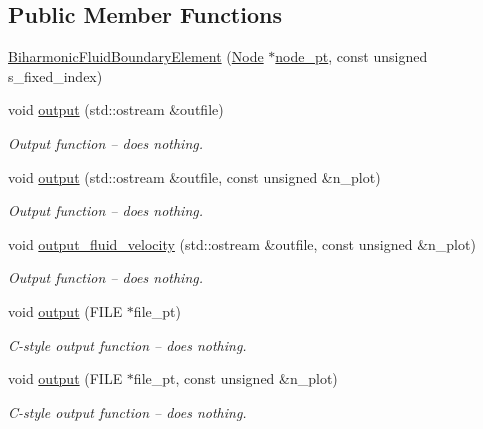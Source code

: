 \subsection*{Public Member Functions}
\begin{DoxyCompactItemize}
\item 
\hyperlink{classoomph_1_1BiharmonicFluidBoundaryElement_a7753395db6939adf4c2ebf5b7d251cef}{Biharmonic\+Fluid\+Boundary\+Element} (\hyperlink{classoomph_1_1Node}{Node} $\ast$\hyperlink{classoomph_1_1FiniteElement_ace0e7fb72a805b5c2c600347bfae7a9b}{node\+\_\+pt}, const unsigned s\+\_\+fixed\+\_\+index)
\item 
void \hyperlink{classoomph_1_1BiharmonicFluidBoundaryElement_a20586e08a9a747f2165b9e2eeb62a4dc}{output} (std\+::ostream \&outfile)
\begin{DoxyCompactList}\small\item\em Output function -- does nothing. \end{DoxyCompactList}\item 
void \hyperlink{classoomph_1_1BiharmonicFluidBoundaryElement_a74ffdc1669962263212c95e7acc3cce2}{output} (std\+::ostream \&outfile, const unsigned \&n\+\_\+plot)
\begin{DoxyCompactList}\small\item\em Output function -- does nothing. \end{DoxyCompactList}\item 
void \hyperlink{classoomph_1_1BiharmonicFluidBoundaryElement_a9a639b1f556286e525b221ed9a96e7f5}{output\+\_\+fluid\+\_\+velocity} (std\+::ostream \&outfile, const unsigned \&n\+\_\+plot)
\begin{DoxyCompactList}\small\item\em Output function -- does nothing. \end{DoxyCompactList}\item 
void \hyperlink{classoomph_1_1BiharmonicFluidBoundaryElement_a69586e3f67ee447c376e0a5c6bac9461}{output} (F\+I\+LE $\ast$file\+\_\+pt)
\begin{DoxyCompactList}\small\item\em C-\/style output function -- does nothing. \end{DoxyCompactList}\item 
void \hyperlink{classoomph_1_1BiharmonicFluidBoundaryElement_a41c4acc14c45cb120c33d02baf7a5189}{output} (F\+I\+LE $\ast$file\+\_\+pt, const unsigned \&n\+\_\+plot)
\begin{DoxyCompactList}\small\item\em C-\/style output function -- does nothing. \end{DoxyCompactList}\item 

\end{DoxyCompactItemize}
